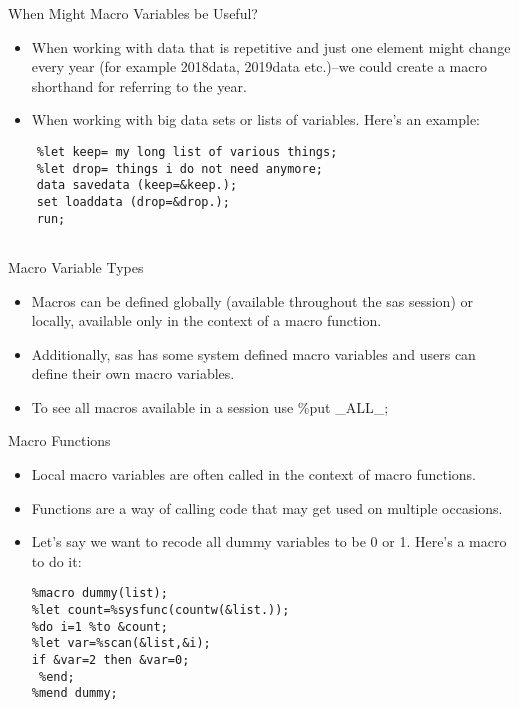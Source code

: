\documentclass{beamer}
\begin{document}
\begin{frame}[fragile]{When Might Macro Variables be Useful?}
\begin{itemize}
    \item When working with data that is repetitive and just one element might change every year (for example 2018data, 2019data etc.)--we could create a macro shorthand for referring to the year.
    \item When working with big data sets or lists of variables. Here's an example:
\end{itemize}
\begin{verbatim}
    %let keep= my long list of various things;
    %let drop= things i do not need anymore;
    data savedata (keep=&keep.);
    set loaddata (drop=&drop.);
    run;
    
\end{verbatim}
\end{frame}
\begin{frame}[fragile]{Macro Variable Types}
\begin{itemize}
    \item Macros can be defined globally (available throughout the sas session) or locally, available only in the context of a macro function.
    \item Additionally, sas has some system defined macro variables and users can define their own macro variables.
    \item To see all macros available in a session use \%put \_ALL\_;
\end{itemize}
\end{frame}
\begin{frame}[fragile]{Macro Functions}
\begin{itemize}
    \item Local macro variables are often called in the context of macro functions.
    \item Functions are a way of calling code that may get used on multiple occasions.
    \item Let's say we want to recode all dummy variables to be 0 or 1.  Here's a macro to do it:
    \begin{verbatim}
%macro dummy(list);
%let count=%sysfunc(countw(&list.));
%do i=1 %to &count;
%let var=%scan(&list,&i);
if &var=2 then &var=0;
 %end;
%mend dummy;
    \end{verbatim}
\end{itemize}
\end{frame}
\end{document}
